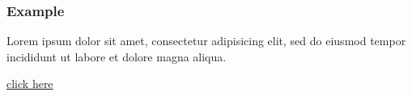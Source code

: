 \begin{frame}\frametitle{Example}

\label{contents}

\begin{example}
Lorem ipsum dolor sit amet, consectetur adipisicing elit, sed do eiusmod tempor incididunt ut labore et dolore magna aliqua.
\end{example}
 
\hyperlink{contents}{click here}
\hyperlink{contents}{}
\hyperlink{columns}{}
\hyperlink{pictures}{}
\hyperlink{pictures}{}

\end{frame}